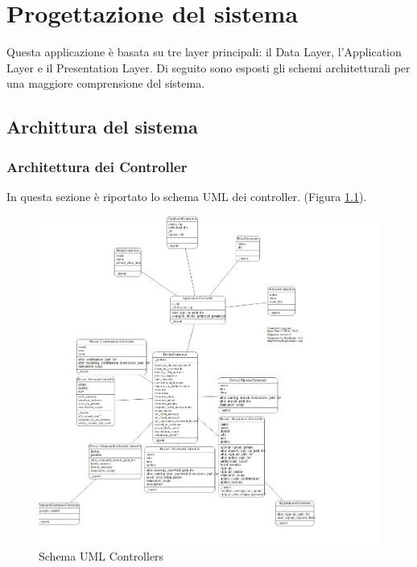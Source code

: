 \documentclass[Lau, binding=0.6cm, oneside]{sapthesis}
\begin{document}
\chapter{Progettazione del sistema}

Questa applicazione è basata su tre layer principali: il Data Layer, l'Application Layer e il Presentation Layer. Di seguito sono esposti gli schemi architetturali per una maggiore comprensione del sistema.

\section{Archittura del sistema}

\subsection{Architettura dei Controller}

In questa sezione è riportato lo schema UML dei controller. (Figura \ref{fig:schema_UML_controllers}).\\

\begin{figure}[H]
	\centering
	\includegraphics[width=1\linewidth]{images/controllers_UML} 
	\caption{Schema UML Controllers}
	\label{fig:schema_UML_controllers}
\end{figure}
\end{document}

